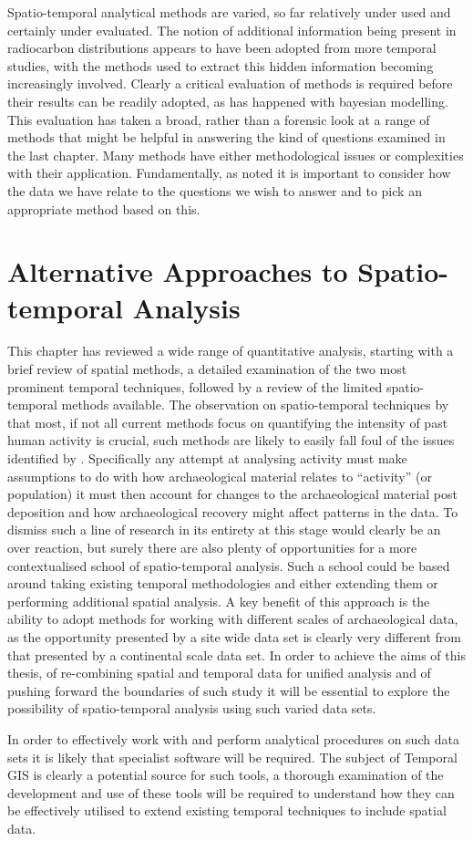 Spatio-temporal analytical methods are varied, so far relatively under used and certainly under evaluated. The notion of additional information being present in radiocarbon distributions appears to have been adopted from more temporal studies, with the methods used to extract this hidden information becoming increasingly involved. Clearly a critical evaluation of methods is required before their results can be readily adopted, as has happened with bayesian modelling. This evaluation has taken a broad, rather than a forensic look at a range of methods that might be helpful in answering the kind of questions examined in the last chapter. Many methods have either methodological issues or complexities with their application. Fundamentally, as \citet{Torfing2015203} noted it is important to consider how the data we have relate to the questions we wish to answer and to pick an appropriate method based on this. 

\section{Alternative Approaches to Spatio-temporal Analysis}
This chapter has reviewed a wide range of quantitative analysis, starting with a brief review of spatial methods, a detailed examination of the two most prominent temporal techniques, followed by a review of the limited spatio-temporal methods available. The observation on spatio-temporal techniques by \citet{Demjn2016100} that most, if not all current methods focus on quantifying the intensity of past human activity is crucial, such methods are likely to easily fall foul of the issues identified by \citet{Torfing2015193}. Specifically any attempt at analysing activity must make assumptions to do with how archaeological material relates to ``activity'' (or population) it must then account for changes to the archaeological material post deposition and how archaeological recovery might affect patterns in the data. To dismiss such a line of research in its entirety at this stage would clearly be an over reaction, but surely there are also plenty of opportunities for a more contextualised school of spatio-temporal analysis. Such a school could be based around taking existing temporal methodologies and either extending them or performing additional spatial analysis. A key benefit of this approach is the ability to adopt methods for working with different scales of archaeological data, as the opportunity presented by a site wide data set is clearly very different from that presented by a continental scale data set. In order to achieve the aims of this thesis, of re-combining spatial and temporal data for unified analysis and of pushing forward the boundaries of such study it will be essential to explore the possibility of spatio-temporal analysis using such varied data sets.

In order to effectively work with and perform analytical procedures on such data sets it is likely that specialist software will be required. The subject of Temporal GIS is clearly a potential source for such tools, a thorough examination of the development and use of these tools will be required to understand how they can be effectively utilised to extend existing temporal techniques to include spatial data.